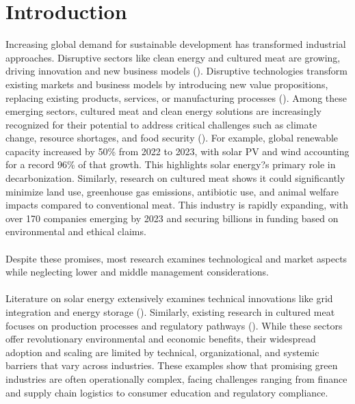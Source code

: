 
\section{Introduction}

Increasing global demand for sustainable development has transformed industrial approaches. Disruptive sectors like clean energy and cultured meat are growing, driving innovation and new business models (\textcite{SeedBlink2025, Deloitte2025}). Disruptive technologies transform existing markets and business models by introducing new value propositions, replacing existing products, services, or manufacturing processes (\textcite{Bower1995}). Among these emerging sectors, cultured meat and clean energy solutions are increasingly recognized for their potential to address critical challenges such as climate change, resource shortages, and food security (\textcite{Wageningen2022, GFI2025future}). For example, global renewable capacity increased by 50\% from 2022 to 2023, with solar PV and wind accounting for a record 96\% of that growth. This highlights solar energy?s primary role in decarbonization. Similarly, research on cultured meat shows it could significantly minimize land use, greenhouse gas emissions, antibiotic use, and animal welfare impacts compared to conventional meat. This industry is rapidly expanding, with over 170 companies emerging by 2023 and securing billions in funding based on environmental and ethical claims.

\paragraph*{} Despite these promises, most research examines technological and market aspects while neglecting lower and middle management considerations.

\paragraph*{}
Literature on solar energy extensively examines technical innovations like grid integration and energy storage (\textcite{SINSEL20202271}). Similarly, existing research in cultured meat focuses on production processes and regulatory pathways (\textcite{Bryant2020}). While these sectors offer revolutionary environmental and economic benefits, their widespread adoption and scaling are limited by technical, organizational, and systemic barriers that vary across industries. These examples show that promising green industries are often operationally complex, facing challenges ranging from finance and supply chain logistics to consumer education and regulatory compliance.

